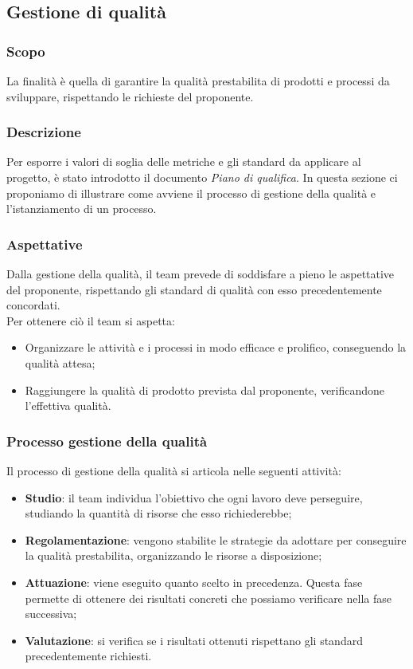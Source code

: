 \subsection{Gestione di qualità} \label{_gestioneDiQualita}

\subsubsection{Scopo}
La finalità è quella di garantire la qualità prestabilita di prodotti e processi da sviluppare, rispettando le richieste del proponente.

\subsubsection{Descrizione}
Per esporre i valori di soglia delle metriche e gli standard da applicare al progetto, è stato introdotto il documento \textit{Piano di qualifica}.
In questa sezione ci proponiamo di illustrare come avviene il processo di gestione della qualità e l'istanziamento di un processo.

\subsubsection{Aspettative}
Dalla gestione della qualità, il team prevede di soddisfare a pieno le aspettative del proponente, rispettando gli standard di qualità con esso  precedentemente concordati.\\
Per ottenere ciò il team si aspetta:
\begin{itemize}
    \item Organizzare le attività e i processi in modo efficace e prolifico, conseguendo la qualità attesa;
    \item Raggiungere la qualità di prodotto prevista dal proponente, verificandone l'effettiva qualità.
\end{itemize}


\subsubsection{Processo gestione della qualità}
Il processo di gestione della qualità si articola nelle seguenti attività:
\begin{itemize}
    \item\textbf{Studio}: il team individua l'obiettivo che ogni lavoro deve perseguire, studiando la quantità di risorse che esso richiederebbe;
    \item \textbf{Regolamentazione}: vengono stabilite le strategie da adottare per conseguire la qualità prestabilita, organizzando le risorse a disposizione;
    \item\textbf{Attuazione}: viene eseguito quanto scelto in precedenza. Questa fase permette di ottenere dei risultati concreti che possiamo verificare nella fase successiva;
    \item\textbf{Valutazione}: si verifica se i risultati ottenuti rispettano gli standard precedentemente richiesti.
\end{itemize}


